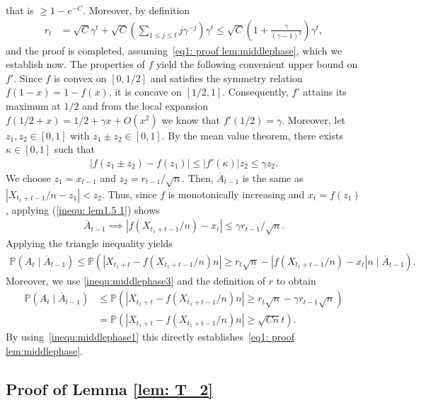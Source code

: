 \documentclass[11pt]{article}
\newcommand{\Prob}{\mathbb{P}}
\numberwithin{theorem}{section}
\begin{document}
that is $\ge 1 - e^{-C}$.
Moreover, by definition
\begin{align*}
r_t &= \sqrt{C}\gamma^t  + \sqrt{C}\left(\sum_{1\leq j\leq t} j\gamma^{-j} \right)\gamma^{t} \leq \sqrt{C}\left(1 + \frac{\gamma}{(\gamma-1)^2}\right)\gamma^t ,
\end{align*}
and the proof is completed, assuming~\eqref{eq1: proof lem:middlephase}, which we establish now. 
The properties of $f$ yield the following convenient upper bound on $f'$. Since $f$ is convex on $[0,1/2]$ and satisfies the symmetry relation $f(1-x)=1-f(x)$, it is concave on $[1/2,1]$. Consequently, $f'$ attains its maximum at $1/2$ and from the local expansion $f(1/2 +x) = 1/2 +\gamma  x+O(x^2)$ we know that $f'(1/2)=\gamma$. 
Moreover, let $z_1, z_2 \in [0,1]$ with $z_1\pm z_2 \in [0,1]$.
By the mean value theorem, there exists $\kappa \in [0,1]$ such that
\begin{align}\label{inequ: lem1.5 1}
| f(z_1\pm z_2) -f(z_1) | \leq | f'(\kappa) | z_2 \leq \gamma z_2.
\end{align}
We choose $z_1=x_{t-1}$ and $z_2=r_{t-1}/\sqrt{n}$. Then, $\overline{A}_{t-1}$ is the same as $|X_{t_1+t-1}/n-z_1|<z_2$.
Thus, since $f$ is monotonically increasing and $x_t=f(z_1)$, applying (\ref{inequ: lem1.5 1}) shows 
\begin{align}\label{inequ:middlephase3}
   \overline{A}_{t-1} \implies | f(X_{t_1+t-1}/n)-x_{t}| \leq \gamma r_{t-1}/ \sqrt{n}.
\end{align}
Applying the triangle inequality yields
\begin{align*}
    \Prob(A_{t}\mid \overline{A}_{t-1}) \leq \Prob\left(| X_{t_1+t}- f(X_{t_1+t-1}/n)n| \geq r_t \sqrt{n} - | f(X_{t_1+t-1}/n) - x_t | n\mid \overline{A}_{t-1}\right).
\end{align*}
Moreover, we use \eqref{inequ:middlephase3} and the definition of $r$ to obtain
\begin{align*}
    \Prob(A_t \mid \overline{A}_{t-1}) &\leq \Prob(| X_{t_1+t}- f(X_{t_1+t-1}/n)n| \geq r_t \sqrt{n} - \gamma r_{t-1} \sqrt{n}) \\
    &= \Prob(| X_{t_1+t}- f(X_{t_1+t-1}/n)n| \geq \sqrt{Cn}t).
\end{align*}
By using~\eqref{inequ:middlephase1} this directly establishes~\eqref{eq1: proof lem:middlephase}.



\subsection{Proof of Lemma \ref{lem: T_2}}\label{subsec: Proof of T_2}
\end{document}
